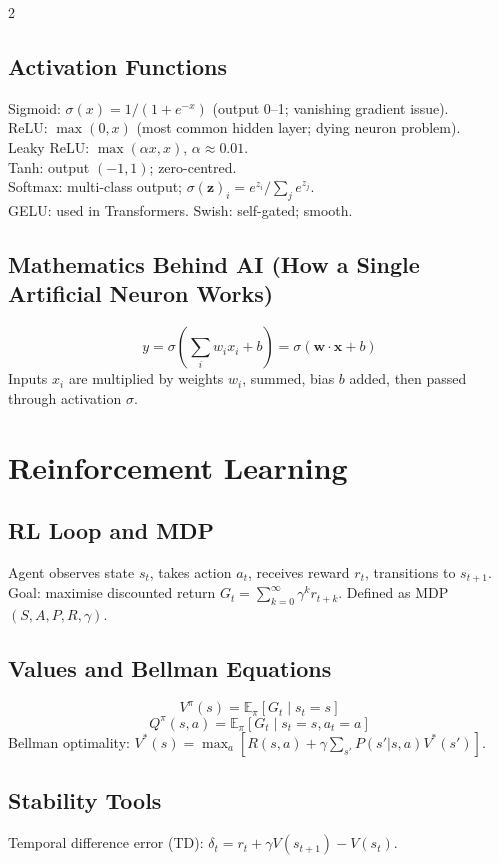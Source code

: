 \documentclass[10pt,a4paper]{article}
\begin{document}
\begin{multicols}{2}
\subsection{Activation Functions}
Sigmoid: $\sigma(x) = 1/(1+e^{-x})$ (output 0--1; vanishing gradient issue).\\
ReLU: $\max(0,x)$ (most common hidden layer; dying neuron problem).\\
Leaky ReLU: $\max(\alpha x, x)$, $\alpha \approx 0.01$.\\
Tanh: output $(-1,1)$; zero-centred.\\
Softmax: multi-class output; $\sigma(\mathbf{z})_i = e^{z_i}/\sum_j e^{z_j}$.\\
GELU: used in Transformers. Swish: self-gated; smooth.

\subsection{Mathematics Behind AI (How a Single Artificial Neuron Works)}
\[
y = \sigma\!\left(\sum_i w_i x_i + b\right) = \sigma(\mathbf{w}\cdot\mathbf{x} + b)
\]
Inputs $x_i$ are multiplied by weights $w_i$, summed, bias $b$ added, then passed through activation $\sigma$.

\section{Reinforcement Learning}

\subsection{RL Loop and MDP}
Agent observes state $s_t$, takes action $a_t$, receives reward $r_t$, transitions to $s_{t+1}$. Goal: maximise discounted return $G_t = \sum_{k=0}^\infty \gamma^k r_{t+k}$. Defined as MDP $(S, A, P, R, \gamma)$.

\subsection{Values and Bellman Equations}
\[
V^\pi(s) = \mathbb{E}_\pi\!\left[G_t \mid s_t=s\right]
\]
\[
Q^\pi(s,a) = \mathbb{E}_\pi\!\left[G_t \mid s_t=s, a_t=a\right]
\]
Bellman optimality: $V^*(s) = \max_a [R(s,a) + \gamma\sum_{s'} P(s'|s,a)V^*(s')]$.

\subsection{Stability Tools}
Temporal difference error (TD): $\delta_t = r_t + \gamma V(s_{t+1}) - V(s_t)$.


\end{multicols}
\end{document}
